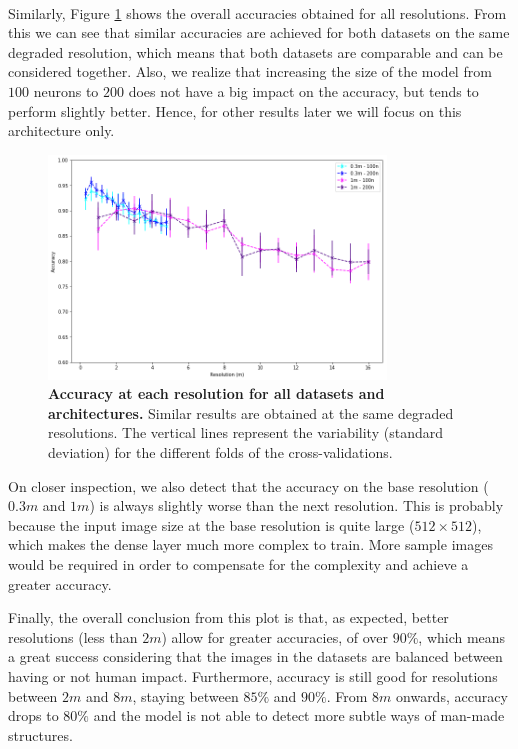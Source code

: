\

Similarly, Figure \ref{fig:acc_res_03m_1m} shows the overall accuracies obtained for all resolutions. From this we can see that similar accuracies are achieved for both datasets on the same degraded resolution, which means that both datasets are comparable and can be considered together. Also, we realize that increasing the size of the model from $100$ neurons to $200$ does not have a big impact on the accuracy, but tends to perform slightly better. Hence, for other results later we will focus on this architecture only.

\begin{figure}[h!]
	\centering
	\includegraphics[width=0.8\textwidth]{Figures/results/acc_res_03m_1m.png}
	\captionsetup{width=1\linewidth}
	\caption{\textbf{Accuracy at each resolution for all datasets and architectures.} Similar results are obtained at the same degraded resolutions. The vertical lines represent the variability (standard deviation) for the different folds of the cross-validations.}
	\label{fig:acc_res_03m_1m}
\end{figure}

On closer inspection, we also detect that the accuracy on the base resolution ($0.3m$ and $1m$) is always slightly worse than the next resolution. This is probably because the input image size at the base resolution is quite large ($512\times512$), which makes the dense layer much more complex to train. More sample images would be required in order to compensate for the complexity and achieve a greater accuracy.

Finally, the overall conclusion from this plot is that, as expected, better resolutions (less than $2m$) allow for greater accuracies, of over $90\%$, which means a great success considering that the images in the datasets are balanced between having or not human impact. Furthermore, accuracy is still good for resolutions between $2m$ and $8m$, staying between $85\%$ and $90\%$. From $8m$ onwards, accuracy drops to $80\%$ and the model is not able to detect more subtle ways of man-made structures.

